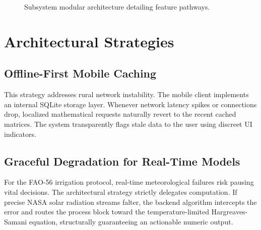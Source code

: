 \begin{figure}[htbp]
  \centering
  \vspace{0.5cm}
  \caption{Subsystem modular architecture detailing feature pathways.}
  \label{fig:subsystem_arch}
\end{figure}

\section{Architectural Strategies}

\subsection{Offline-First Mobile Caching}
This strategy addresses rural network instability. The mobile client implements an internal SQLite storage layer. Whenever network latency spikes or connections drop, localized mathematical requests naturally revert to the recent cached matrices. The system transparently flags stale data to the user using discreet UI indicators. 

\subsection{Graceful Degradation for Real-Time Models}
For the FAO-56 irrigation protocol, real-time meteorological failures risk pausing vital decisions. The architectural strategy strictly delegates computation. If precise NASA solar radiation streams falter, the backend algorithm intercepts the error and routes the process block toward the temperature-limited Hargreaves-Samani equation, structurally guaranteeing an actionable numeric output.


